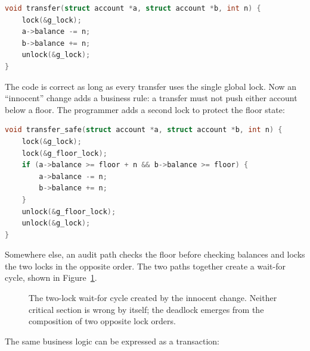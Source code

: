 \begin{lstlisting}[language=C, caption={The global-lock transfer.}, label={lst:transfer-basic}]
void transfer(struct account *a, struct account *b, int n) {
    lock(&g_lock);
    a->balance -= n;
    b->balance += n;
    unlock(&g_lock);
}
\end{lstlisting}

The code is correct as long as every transfer uses the single global lock. Now
an ``innocent'' change adds a business rule: a transfer must not push either
account below a floor. The programmer adds a second lock to protect the floor
state:

\begin{lstlisting}[language=C, caption={The innocent change: two locks, an ordering obligation.}, label={lst:transfer-safe}]
void transfer_safe(struct account *a, struct account *b, int n) {
    lock(&g_lock);
    lock(&g_floor_lock);
    if (a->balance >= floor + n && b->balance >= floor) {
        a->balance -= n;
        b->balance += n;
    }
    unlock(&g_floor_lock);
    unlock(&g_lock);
}
\end{lstlisting}

Somewhere else, an audit path checks the floor before checking balances and
locks the two locks in the opposite order. The two paths together create a
wait-for cycle, shown in Figure~\ref{fig:two-lock-deadlock}.

\begin{figure}[htbp]
\centering
{}
\caption{The two-lock wait-for cycle created by the innocent change. Neither
critical section is wrong by itself; the deadlock emerges from the
composition of two opposite lock orders.}
\label{fig:two-lock-deadlock}
\end{figure}

The same business logic can be expressed as a transaction:

